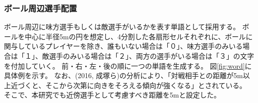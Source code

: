 \subsubsection{ボール周辺選手配置}
ボール周辺に味方選手もしくは敵選手がいるかを表す単語として採用する。
ボールを中心に半径5mの円を想定し、4分割した各扇形セルそれぞれに、ボールに関与しているプレイヤーを除き、誰もいない場合は「０」、味方選手のみいる場合は「１」、敵選手のみいる場合は「２」、両方の選手がいる場合は「３」の文字を付加していく。
前・右・左・後の順に一つの単語を生成する。
図\ref{fig:word}に具体例を示す。
なお、(2016, 成塚ら)の分析により、「対戦相手との距離が5m以上近づくと、そこから次第に向きをそろえる傾向が強くなる」とされている\cite{2016nar}。
そこで、本研究でも近傍選手として考慮すべき距離を5mと設定した。






